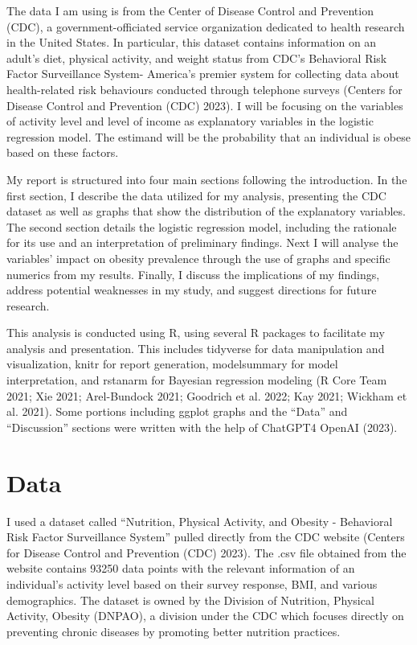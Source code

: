 \documentclass[
  letterpaper,
  DIV=11,
  numbers=noendperiod]{scrartcl}
\begin{document}
The data I am using is from the Center of Disease Control and Prevention
(CDC), a government-officiated service organization dedicated to health
research in the United States. In particular, this dataset contains
information on an adult's diet, physical activity, and weight status
from CDC's Behavioral Risk Factor Surveillance System- America's premier
system for collecting data about health-related risk behaviours
conducted through telephone surveys (Centers for Disease Control and
Prevention (CDC) 2023). I will be focusing on the variables of activity
level and level of income as explanatory variables in the logistic
regression model. The estimand will be the probability that an
individual is obese based on these factors.

My report is structured into four main sections following the
introduction. In the first section, I describe the data utilized for my
analysis, presenting the CDC dataset as well as graphs that show the
distribution of the explanatory variables. The second section details
the logistic regression model, including the rationale for its use and
an interpretation of preliminary findings. Next I will analyse the
variables' impact on obesity prevalence through the use of graphs and
specific numerics from my results. Finally, I discuss the implications
of my findings, address potential weaknesses in my study, and suggest
directions for future research.

This analysis is conducted using R, using several R packages to
facilitate my analysis and presentation. This includes tidyverse for
data manipulation and visualization, knitr for report generation,
modelsummary for model interpretation, and rstanarm for Bayesian
regression modeling (R Core Team 2021; Xie 2021; Arel-Bundock 2021;
Goodrich et al. 2022; Kay 2021; Wickham et al. 2021). Some portions
including ggplot graphs and the ``Data'' and ``Discussion'' sections
were written with the help of ChatGPT4 OpenAI (2023).

\newpage

\hypertarget{data}{%
\section{Data}\label{data}}

I used a dataset called ``Nutrition, Physical Activity, and Obesity -
Behavioral Risk Factor Surveillance System'' pulled directly from the
CDC website (Centers for Disease Control and Prevention (CDC) 2023). The
.csv file obtained from the website contains 93250 data points with the
relevant information of an individual's activity level based on their
survey response, BMI, and various demographics. The dataset is owned by
the Division of Nutrition, Physical Activity, Obesity (DNPAO), a
division under the CDC which focuses directly on preventing chronic
diseases by promoting better nutrition practices.
\end{document}
